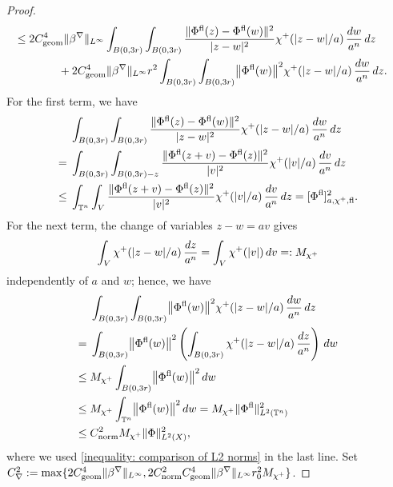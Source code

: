 \documentclass[a4paper,oneside,12pt]{amsart}
\theoremstyle{plain}
\theoremstyle{definition}
\theoremstyle{remark}
\DeclarePairedDelimiter{\abs}{\lvert}{\rvert}
\DeclarePairedDelimiter{\norm}{\lVert}{\rVert}
\DeclarePairedDelimiter{\seminorm}{\lbrack}{\rbrack}
\newcommand{\flattorus}{\mathbb{T}^n}
\newcommand{\Ltwonorm}[2][L^2]{\norm{#2}_{#1}}
\newcommand{\flatmesoscopicdifferenceseminorm}[3][a]{\seminorm{#3}_{#1,#2,\mathrm{fl}}}
\newcommand{\cutoff}{\beta}
\newcommand{\cutoffnabla}{\cutoff^{\nabla}}
\newcommand{\cutoffupper}{\chi^+}
\newcommand{\flatmodel}[1]{#1^{\mathrm{fl}}}
\newcommand{\constantgeometric}{C_{\mathrm{geom}}}
\newcommand{\constantLtwonorm}{C_{\mathrm{norm}}}
\newcommand{\constantnabla}{C_{\nabla}}
\begin{document}
\begin{proof}
\begin{equation}
\begin{aligned}
    \le{}& \begin{multlined}[t]
      2 \constantgeometric^4 \norm{\cutoffnabla}_{L^{\infty}} \int_{B(0,3r)} \int_{B(0,3r)} \frac{\norm{\flatmodel{\Phi}(z)-\flatmodel{\Phi}(w)}^2}{\abs{z-w}^2} \cutoffupper(\abs{z-w}/a) \,\frac{dw}{a^n} \,dz \\
      + 2 \constantgeometric^4 \norm{\cutoffnabla}_{L^{\infty}} r^2 \int_{B(0,3r)} \int_{B(0,3r)} \norm*{\flatmodel{\Phi}(w)}^2 \cutoffupper(\abs{z-w}/a) \,\frac{dw}{a^n} \,dz.
    \end{multlined}
    \end{aligned}
  \end{equation}
  For the first term, we have
  \begin{equation}
    \begin{aligned}
    & \int_{B(0,3r)} \int_{B(0,3r)} \frac{\norm{\flatmodel{\Phi}(z)-\flatmodel{\Phi}(w)}^2}{\abs{z-w}^2} \cutoffupper(\abs{z-w}/a) \,\frac{dw}{a^n} \,dz \\
    ={}& \int_{B(0,3r)} \int_{B(0,3r)-z} \frac{\norm{\flatmodel{\Phi}(z+v)-\flatmodel{\Phi}(z)}^2}{\abs{v}^2} \cutoffupper(\abs{v}/a) \,\frac{dv}{a^n} \,dz \\
    \le{}& \int_{\flattorus} \int_{V} \frac{\norm{\flatmodel{\Phi}(z+v)-\flatmodel{\Phi}(z)}^2}{\abs{v}^2} \cutoffupper(\abs{v}/a) \,\frac{dv}{a^n} \,dz = \flatmesoscopicdifferenceseminorm{\cutoffupper}{\flatmodel{\Phi}}^2.
    \end{aligned}
  \end{equation}
  For the next term, the change of variables $z-w = av$ gives
  \begin{equation}
    \int_V \cutoffupper(\abs{z-w}/a) \,\frac{dz}{a^n} = \int_V \cutoffupper(\abs{v}) \,dv =: M_{\cutoffupper}
  \end{equation}
  independently of $a$ and $w$; hence, we have
  \begin{equation}
    \begin{aligned}
    & \int_{B(0,3r)} \int_{B(0,3r)} \norm*{\flatmodel{\Phi}(w)}^2 \cutoffupper(\abs{z-w}/a) \,\frac{dw}{a^n} \,dz \\
    ={}& \int_{B(0,3r)} \norm*{\flatmodel{\Phi}(w)}^2 \left( \int_{B(0,3r)} \cutoffupper(\abs{z-w}/a) \,\frac{dz}{a^n} \right) \,dw \\
    \le{}& M_{\cutoffupper} \int_{B(0,3r)} \norm*{\flatmodel{\Phi}(w)}^2 \,dw \\
    \le{}& M_{\cutoffupper} \int_{\flattorus} \norm*{\flatmodel{\Phi}(w)}^2 \,dw = M_{\cutoffupper} \Ltwonorm[L^2(\flattorus)]{\flatmodel{\Phi}}^2 \\
    \le{}& \constantLtwonorm^2 M_{\cutoffupper} \Ltwonorm[L^2(X)]{\Phi}^2,
    \end{aligned}
  \end{equation}
  where we used \eqref{inequality: comparison of L2 norms} in the last line.
  Set $\constantnabla^2 := \max \{ 2 \constantgeometric^4 \norm{\cutoffnabla}_{L^{\infty}}, 2 \constantLtwonorm^2 \constantgeometric^4 \norm{\cutoffnabla}_{L^{\infty}} r_0^2 M_{\cutoffupper} \}$.
\end{proof}
\end{document}
